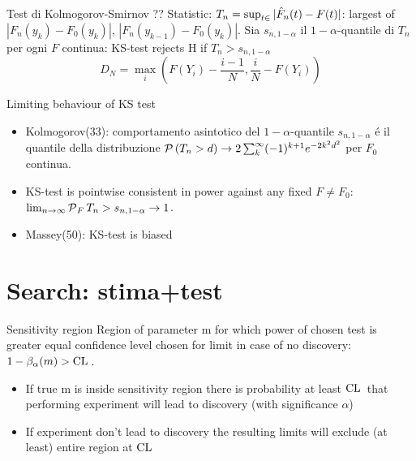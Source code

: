 \begin{frame}{Test di Kolmogorov-Smirnov ??}
Statistic: $T_n=\sup_{t\in\real}{|\hat{F}_n(t)-F(t)|}$: largest of $|F_n(y_k)-F_0(y_k)|$, $|F_n(y_{k-1})-F_0(y_k)|$. Sia $s_{n,1-\alpha}$ il $1-\alpha$-quantile di $T_n$ per ogni $F$ continua: KS-test rejects H if $T_n>s_{n,1-\alpha}$
\[D_N=\max_{i}(F(Y_i)-\frac{i-1}{N},\frac{i}{N}-F(Y_i))\]
\begin{block}{Limiting behaviour of KS test}
\begin{itemize}
\item Kolmogorov(33): comportamento asintotico del $1-\alpha$-quantile $s_{n,1-\alpha}$ \'e il quantile della distribuzione $\operatorname{\mathcal{P}}{(T_n>d)}\to2\sum_k^{\infty}(-1)^{k+1}e^{-2k^2d^2}$ per $F_0$ continua.
\item KS-test is pointwise consistent in power against any fixed $F\neq F_0$: $\lim_{n\to\infty}\operatorname{\mathcal{P}}_F{T_n>s_{n,1-\alpha}}\to1$.
\item Massey(50): KS-test is biased
\end{itemize}
\end{block}
\end{frame}

\section{Search: stima+test}

\begin{frame}{Sensitivity region}
Region of parameter m for which power of chosen test is greater equal confidence level chosen for limit in case of no discovery: $1-\beta_{\alpha}(m)>\operatorname{CL}{}$.
\begin{itemize}
\item If true m is inside sensitivity region there is probability at least $\operatorname{CL}{}$ that performing experiment will lead to discovery (with significance $\alpha$)
\item If experiment don't lead to discovery the resulting limits will exclude (at least) entire region at $\operatorname{CL}{}$
\end{itemize}
\end{frame}
